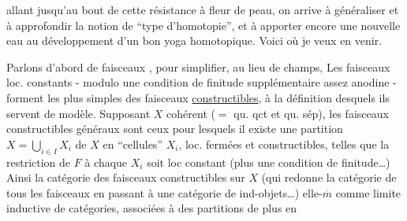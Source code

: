 allant jusqu'au bout\unsure{,} de cette résistance à fleur de peau, on arrive à généraliser et à approfondir la notion de ``type d'homotopie'', et à apporter encore une nouvelle eau au développement d'un bon yoga homotopique. Voici où je veux en venir.

Parlons d'abord de faisceaux , pour simplifier, au lieu de champs,  Les faisceaux loc. constants - modulo une condition de finitude supplémentaire assez anodine - forment les plus simples des faisceaux \uline{constructibles}, à la définition desquels ils servent de modèle. Supposant $X$ cohérent ($=$ qu. qct et qu. sép), les faisceaux constructibles généraux sont ceux pour lesquels il existe une partition  $X=\bigcup\limits_{i\in I}X_i$\makebox[0pt][r]{\raisebox{-1.3ex}{\(\unsure{\cdot}\)\hspace{0.5em}}} de $X$ en ``cellules''  $X_i$, loc. fermées et constructibles, telles que  la restriction de $F$ à chaque $X_i$ soit loc constant  (plus une condition de finitude\ldots) Ainsi la catégorie des faisceaux constructibles sur $X$  (qui redonne la catégorie de tous les faisceaux en passant à une catégorie de ind-objets\ldots)  elle-$\overline m$ comme limite inductive de catégories, associées à des partitions de plus en
